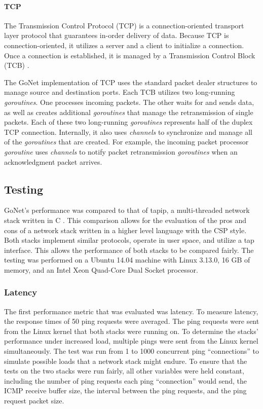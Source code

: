 \documentclass[twocolumn,10pt]{article}
\begin{document}
\paragraph{TCP}
The Transmission Control Protocol (TCP) is a connection-oriented transport layer protocol that guarantees in-order delivery of data. Because TCP is connection-oriented, it utilizes a server and a client to initialize a connection. Once a connection is established, it is managed by a Transmission Control Block (TCB) \cite{TCPRFC}. 

The GoNet implementation of TCP uses the standard packet dealer structures to manage source and destination ports. 
Each TCB utilizes two long-running \textit{goroutines}. One processes incoming packets. The other waits for and sends data, as well as creates additional \textit{goroutines} that manage the retransmission of single packets. Each of these two long-running \textit{goroutines} represents half of the duplex TCP connection. Internally, it also uses \textit{channels} to synchronize and manage all of the \textit{goroutines} that are created. For example, the incoming packet processor \textit{goroutine} uses \textit{channels} to notify packet retransmission \textit{goroutines} when an acknowledgment packet arrives.

\subsection{Testing}
GoNet's performance was compared to that of tapip, a multi-threaded network stack written in C \cite{tapip}. This comparison allows for the evaluation of the pros and cons of a network stack written in a higher level language with the CSP style. Both stacks implement similar protocols, operate in user space, and utilize a tap interface. This allows the performance of both stacks to be compared fairly. The testing was performed on a Ubuntu 14.04 machine with Linux 3.13.0, 16 GB of memory, and an Intel Xeon Quad-Core Dual Socket processor. 

\subsubsection{Latency}
The first performance metric that was evaluated was latency. To measure latency, the response times of 50 ping requests were averaged. The ping requests were sent from the Linux kernel that both stacks were running on.
To determine the stacks' performance under increased load, multiple pings were sent from the Linux kernel simultaneously. The test was run from 1 to 1000 concurrent ping ``connections'' to simulate possible loads that a network stack might endure.
To ensure that the tests on the two stacks were run fairly, all other variables were held constant, including the number of ping requests each ping ``connection'' would send, the ICMP receive buffer size, the interval between the ping requests, and the ping request packet size.
\end{document}

